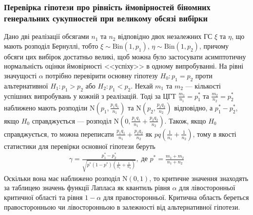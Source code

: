 \subsubsection*{Перевірка гіпотези про рівність ймовірностей біномних генеральних 
сукупностей при великому обсязі вибірки}
Дано дві реалізації обсягами $n_1$ та $n_2$ відповідно двох незалежних ГС $\xi$ та $\eta$, що мають розподіл Бернуллі, тобто
$\xi \sim \mathrm{Bin}(1, p_1)$, $\eta \sim \mathrm{Bin}(1, p_2)$,
причому обсяги цих вибірок достатньо великі, щоб можна було застосувати асимптотичну
нормальність оцінки ймовірності <<успіху>> в одному випробуванні. На рівні значущості
$\alpha$ потрібно перевірити основну гіпотезу $H_0: p_1 = p_2$ проти альтернативної
$H_1: p_1 > p_2$ або $H_2: p_1 < p_2$. Нехай $m_1$ та $m_2$ --- кількості успішних випробувань
у кожній з реалізацій. Тоді за ЦГТ
$\frac{m_1}{n_1} = p_1^*$ та $\frac{m_2}{n_2} = p_2^*$ наближено мають розподіли
$\mathrm{N}\left(p_1, \frac{p_1 q_1}{n_1}\right)$ та $\mathrm{N}\left(p_2, \frac{p_2 q_2}{n_2}\right)$ відповідно,
а $p_1^* - p_2^*$, якщо $H_0$ справджується --- розподіл $\mathrm{N}\left(0, \frac{p_1 q_1}{n_1} + \frac{p_2 q_2}{n_2}\right)$.
Також, якщо $H_0$ справджується, то можна переписати $\frac{p_1 q_1}{n_1} + \frac{p_2 q_2}{n_2}$
як $p q \left(\frac{1}{n_1} + \frac{1}{n_2}\right)$, тому в якості статистики для перевірки основної гіпотези беруть
\begin{gather*}
    \gamma = \frac{p_1^* - p_2^*}{\sqrt{p^* (1 - p^*) \left(\frac{1}{n_1} + \frac{1}{n_2}\right)}},
    \; \text{де } p^* = \frac{m_1 + m_2}{n_1 + n_2}
\end{gather*}
Оскільки вона має наближено розподіл $\mathrm{N}(0, 1)$, то критичне значення знаходять
за таблицею значень функції Лапласа як квантиль рівня $\alpha$ для лівосторонньої критичної області
та рівня $1-\alpha$ для правосторонньої. Критична область береться правосторонньою чи лівосторонньою
в залежності від альтернативної гіпотези.

